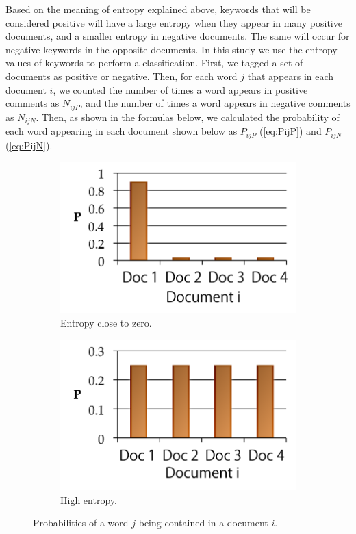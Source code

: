 \documentclass[review]{elsarticle}
\begin{document}
Based on the meaning of entropy explained above, keywords that will be considered positive will have a large entropy when they appear in many positive documents, and a smaller entropy in negative documents. The same will occur for negative keywords in the opposite documents. In this study we use the entropy values of keywords to perform a classification. First, we tagged a set of documents as positive or negative. Then, for each word \(j\) that appears in each document \(i\), we counted the number of times a word appears in positive comments as \(N_{ijP}\), and the number of times a word appears in negative comments as \(N_{ijN}\). Then, as shown in the formulas below, we calculated the probability of each word appearing in each document shown below as \(P_{ijP}\) (\ref{eq:PijP}) and \(P_{ijN}\) (\ref{eq:PijN}).

\begin{figure}[bh]
    \centering
    \begin{subfigure}[b]{0.4\linewidth}
        \includegraphics[width=\linewidth]{entropyzero.png}
        \caption{Entropy close to zero.}
    \end{subfigure}
    \begin{subfigure}[b]{0.4\linewidth}
        \includegraphics[width=\linewidth]{entropyhigh.png}
        \caption{High entropy.}
    \end{subfigure}
\caption{Probabilities of a word \(j\) being contained in a document \(i\).}
\label{fig:entropygraphs}
\end{figure}
\end{document}
